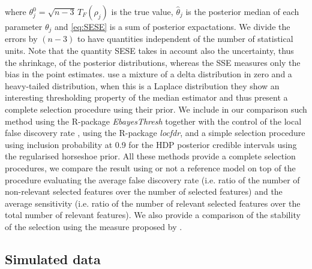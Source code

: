 \documentclass[american,]{article}
\theoremstyle{definition}
\begin{document}
where $\theta_{j}^{0}=\sqrt{n-3}\,T_{F}(\rho_{j})$ is the true value, $\hat{\theta}_{j}$ is the posterior median of each parameter $\theta_{j}$ and \eqref{eq:SESE} is a sum of posterior expactations. We divide the errors by $(n-3)$ to have quantities independent of the number of statistical units. Note that the quantity SESE takes in account also the uncertainty, thus the shrinkage, of the posterior distributions, whereas the SSE measures only the bias in the point estimates. \cite{paper:EBmed} use a mixture of a delta distribution in zero and a heavy-tailed distribution, when this is a Laplace distribution they show an interesting thresholding property of the median estimator and thus present a complete selection procedure using their prior. We include in our comparison such method using the R-package \textit{EbayesThresh} together with the control of the local false discovery rate \citep{book:efron, paper:efron}, using the R-package \textit{locfdr}, and a simple selection procedure using inclusion probability at 0.9 for the HDP posterior credible intervals using the regularised horseshoe prior. All these methods provide a complete selection procedures, we compare the result using or not a reference model on top of the procedure evaluating the average false discovery rate (i.e. ratio of the number of non-relevant selected features over the number of selected features) and the average sensitivity (i.e. ratio of the number of relevant selected features over the total number of relevant features). We also provide a comparison of the stability of the selection using the measure proposed by \cite{paper:stability}.

\hypertarget{simulated-data}{%
\subsection{Simulated data}\label{simulated-data}}
\end{document}
